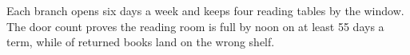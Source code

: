 Each branch opens six days a week and keeps four reading tables by the window.
The door count proves the reading room is full by noon on at least 55 days a term, while  of returned books land on the wrong shelf.
